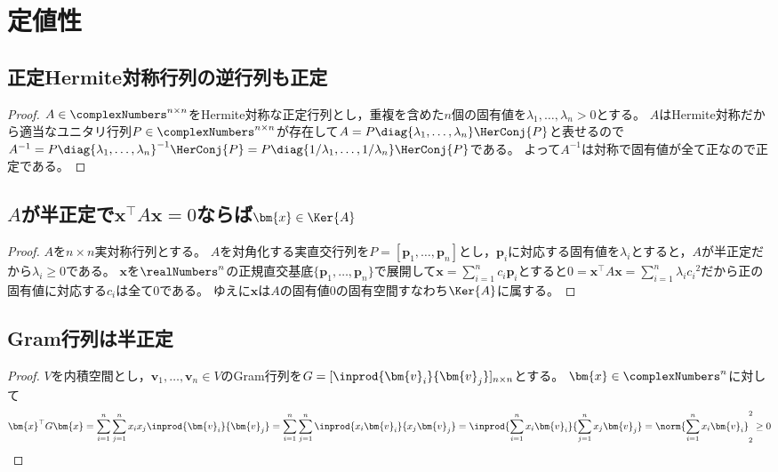 \chapter{定値性}
    \section{正定Hermite対称行列の逆行列も正定}
        \begin{proof}
            \quad\par
            $A\in\complexNumbers^{n\times n}$をHermite対称な正定行列とし，重複を含めた$n$個の固有値を$\lambda_1,\dotsc,\lambda_n > 0$とする。
            $A$はHermite対称だから適当なユニタリ行列$P\in\complexNumbers^{n\times n}$が存在して$A = P\diag{\lambda_1,\dotsc,\lambda_n}\HerConj{P}$と表せるので
            $A^{-1} = P\diag{\lambda_1,\dotsc,\lambda_n}^{-1}\HerConj{P} = P\diag{1/\lambda_1,\dotsc,1/\lambda_n}\HerConj{P}$である。
            よって$A^{-1}$は対称で固有値が全て正なので正定である。
        \end{proof}
    \section{\texorpdfstring{$A$}{A}が半正定で\texorpdfstring{$\bm{x}^\top A\bm{x}=0$}{x\string^⊤Ax = 0}ならば\texorpdfstring{$\bm{x}\in\Ker{A}$}{x∈Ker(A)}}
        \begin{proof}
            \quad\par
            $A$を$n\times n$実対称行列とする。
            $A$を対角化する実直交行列を$P = [\bm{p}_1,\dotsc,\bm{p}_n]$とし，$\bm{p}_i$に対応する固有値を$\lambda_i$とすると，$A$が半正定だから$\lambda_i\geq 0$である。
            $\bm{x}$を$\realNumbers^n$の正規直交基底$\{\bm{p}_1,\dotsc,\bm{p}_n\}$で展開して$\bm{x} = \sum_{i=1}^n c_i\bm{p}_i$とすると$0 = \bm{x}^\top A\bm{x} = \sum_{i=1}^n \lambda_i {c_i}^2$だから正の固有値に対応する$c_i$は全て0である。
            ゆえに$\bm{x}$は$A$の固有値$0$の固有空間すなわち$\Ker{A}$に属する。
        \end{proof}
    \section{Gram行列は半正定}
        \begin{proof}
            \quad\par
            $V$を内積空間とし，$\bm{v}_1,\dotsc,\bm{v}_n\in V$のGram行列を$G=[\inprod{\bm{v}_i}{\bm{v}_j}]_{n\times n}$とする。
            $\bm{x}\in \complexNumbers^n$に対して
            \[ \bm{x}^\top G\bm{x} = \sum_{i=1}^n\sum_{j=1}^n x_i x_j \inprod{\bm{v}_i}{\bm{v}_j} = \sum_{i=1}^n\sum_{j=1}^n \inprod{x_i\bm{v}_i}{x_j\bm{v}_j} = \inprod{\sum_{i=1}^n x_i\bm{v}_i}{\sum_{j=1}^n x_j\bm{v}_j} = \norm{\sum_{i=1}^n x_i\bm{v}_i}_2^2 \geq 0 \]
        \end{proof}
